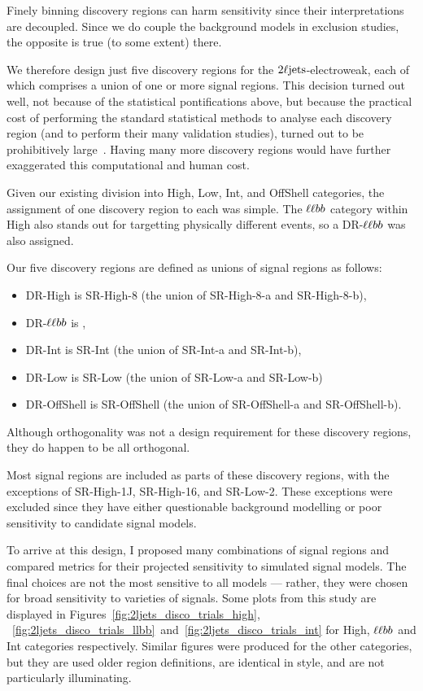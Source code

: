 Finely binning discovery regions can harm sensitivity since their
interpretations are decoupled.
Since we do couple the background models in exclusion studies,
the opposite is true (to some extent) there.

We therefore design just five discovery regions for the
$2\ell\mathrm{jets}$-electroweak, each of which comprises a union of one or more
signal regions.
This decision turned out well, not because of the statistical pontifications
above, but because the practical cost of performing the standard statistical
methods to analyse each discovery region (and to perform their many validation
studies), turned out to be prohibitively large~\cite{verkerke2003roofit}.
Having many more discovery regions would have further exaggerated this
computational and human cost.

Given our existing division into High, Low, Int, and OffShell
categories, the assignment of one discovery region to each was simple.
The $\ell\ell bb$ category within High also stands out for targetting physically
different events, so a DR-$\ell\ell bb$ was also assigned.

Our five discovery regions are defined as unions of signal regions as follows:
\begin{itemize}
\item DR-High is SR-High-8 (the union of SR-High-8-a and SR-High-8-b),
\item DR-$\ell\ell bb$ is \srllbb,
\item DR-Int is SR-Int (the union of SR-Int-a and SR-Int-b),
\item DR-Low is SR-Low (the union of SR-Low-a and SR-Low-b)
\item DR-OffShell is SR-OffShell (the union of SR-OffShell-a and SR-OffShell-b).
\end{itemize}
Although orthogonality was not a design requirement for these discovery
regions, they do happen to be all orthogonal.

Most signal regions are included as parts of these discovery regions, with the
exceptions of SR-High-1J, SR-High-16, and SR-Low-2.
These exceptions were excluded since they have either questionable background
modelling or poor sensitivity to candidate signal models.

To arrive at this design, I proposed many combinations of signal regions and
compared metrics for their projected sensitivity to simulated signal models.
The final choices are not the most sensitive to all models --- rather, they
were chosen for broad sensitivity to varieties of signals.
Some plots from this study are displayed in
Figures~\ref{fig:2ljets_disco_trials_high},
~\ref{fig:2ljets_disco_trials_llbb}~and~\ref{fig:2ljets_disco_trials_int}
for High, $\ell\ell bb$ and Int categories respectively.
Similar figures were produced for the other categories, but they are used older
region definitions, are identical in style, and are not particularly
illuminating.

